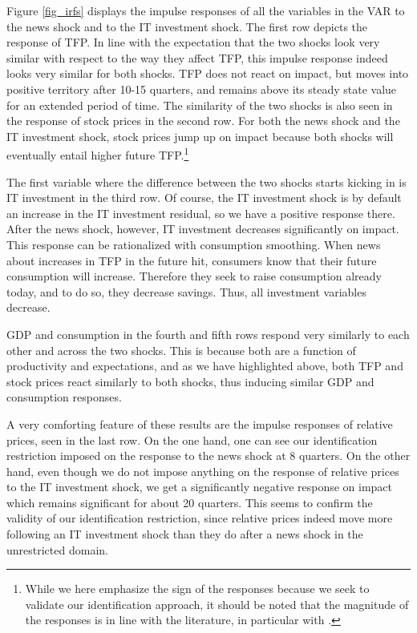 \documentclass[11pt]{article}
\renewcommand{\[}{\begin{equation}}
\renewcommand{\]}{\end{equation}}
\begin{document}
Figure \ref{fig_irfs} displays the impulse responses of all the variables in the VAR to the news shock and to the IT investment shock. The first row depicts the response of TFP. In line with the expectation that the two shocks look very similar with respect to the way they affect TFP, this impulse response indeed looks very similar for both shocks. TFP does not react on impact, but moves into positive territory after 10-15 quarters, and remains above its steady state value for an extended period of time. The similarity of the two shocks is also seen in the response of stock prices in the second row. For both the news shock and the IT investment shock, stock prices jump up on impact because both shocks will eventually entail higher future TFP.\footnote{While we here emphasize the sign of the responses because we seek to validate our identification approach, it should be noted that the magnitude of the responses is in line with the literature, in particular with \cite{barsky_sims2011}.} 

The first variable where the difference between the two shocks starts kicking in is IT investment in the third row. Of course, the IT investment shock is by default an increase in the IT investment residual, so we have a positive response there. After the news shock, however, IT investment decreases significantly on impact. This response can be rationalized with consumption smoothing. When news about increases in TFP in the future hit, consumers know that their future consumption will increase. Therefore they seek to raise consumption already today, and to do so, they decrease savings. Thus, all investment variables decrease. 

GDP and consumption in the fourth and fifth rows respond very similarly to each other and across the two shocks. This is because both are a function of productivity and expectations, and as we have highlighted above, both TFP and stock prices react similarly to both shocks, thus inducing similar GDP and consumption responses.

A very comforting feature of these results are the impulse responses of relative prices, seen in the last row. On the one hand, one can see our identification restriction imposed on the response to the news shock at 8 quarters. On the other hand, even though we do not impose anything on the response of relative prices to the IT investment shock, we get a significantly negative response on impact which remains significant for about 20 quarters. This seems to confirm the validity of our identification restriction, since relative prices indeed move more following an IT investment shock than they do after a news shock in the unrestricted domain. 
\end{document}
